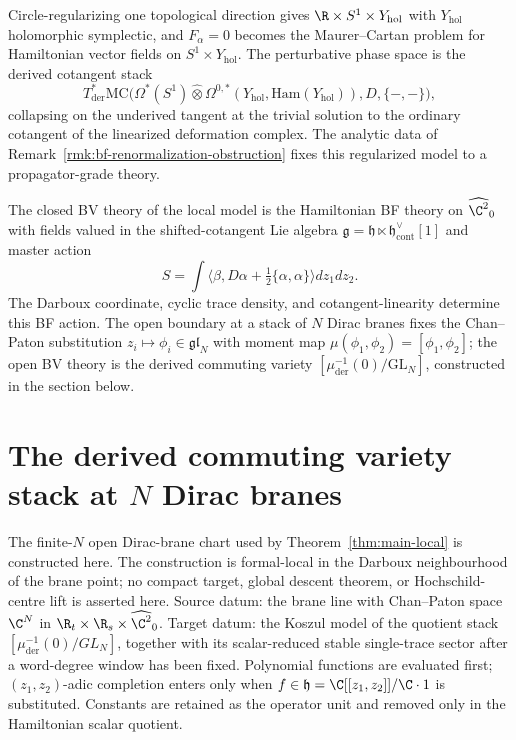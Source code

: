 \documentclass[11pt]{memoir}
\begin{document}
\begin{rmk}\label{rmk:bf-phase-space}
  Circle-regularizing one topological direction gives
  $\R\times S^1\times Y_{\mathrm{hol}}$ with $Y_{\mathrm{hol}}$
  holomorphic symplectic, and $F_\alpha=0$ becomes the Maurer--Cartan
  problem for Hamiltonian vector fields on $S^1\times Y_{\mathrm{hol}}$.
  The perturbative phase space is the derived cotangent stack
  $$T^*_{\mathrm{der}}\mathrm{MC}\bigl(\Omega^*(S^1)\widehat\otimes
    \Omega^{0,*}(Y_{\mathrm{hol}},\mathrm{Ham}(Y_{\mathrm{hol}})),D,\{-,-\}\bigr),$$
  collapsing on the underived tangent at the trivial solution to the
  ordinary cotangent of the linearized deformation complex.  The
  analytic data of Remark~\ref{rmk:bf-renormalization-obstruction}
  fixes this regularized model to a propagator-grade theory.
\end{rmk}

The closed BV theory of the local model is the Hamiltonian BF theory
on \(\widehat{\C^2}_0\) with fields valued in the shifted-cotangent
Lie algebra \(\mathfrak g=\mathfrak h\ltimes\mathfrak h^\vee_{\mathrm{cont}}[1]\)
and master action
\[
  S=\int\langle\beta,D\alpha+\tfrac12\{\alpha,\alpha\}\rangle dz_1dz_2 .
\]
The Darboux coordinate, cyclic trace density, and cotangent-linearity
determine this BF action.
The open boundary at a stack of \(N\) Dirac branes fixes the
Chan--Paton substitution \(z_i\mapsto\phi_i\in\mathfrak{gl}_N\) with
moment map \(\mu(\phi_1,\phi_2)=[\phi_1,\phi_2]\); the open BV theory
is the derived commuting variety
\([\mu^{-1}_{\mathrm{der}}(0)/\mathrm{GL}_N]\), constructed in the
section below.

\section{\texorpdfstring{The derived commuting variety stack at $N$ Dirac branes}{The derived commuting variety stack at N Dirac branes}}\label{sec:derived-commuting-variety}

The finite-\(N\) open Dirac-brane chart used by
Theorem~\ref{thm:main-local} is constructed here.  The construction is
formal-local in the Darboux neighbourhood of the brane point; no compact
target, global descent theorem, or Hochschild-centre lift is asserted
here.
Source datum: the brane line with Chan--Paton space \(\C^N\) in
\(\R_t\times\R_s\times\widehat{\C^2}_{0}\).  Target datum: the Koszul
model of the quotient stack
\([\mu^{-1}_{\mathrm{der}}(0)/GL_N]\), together with its scalar-reduced
stable single-trace sector after a word-degree window has been fixed.
Polynomial functions are evaluated first; \((z_1,z_2)\)-adic completion
enters only when \(f\in\mathfrak h=\C[[z_1,z_2]]/\C\cdot1\) is
substituted.  Constants are retained as the operator unit and removed
only in the Hamiltonian scalar quotient.
\end{document}
